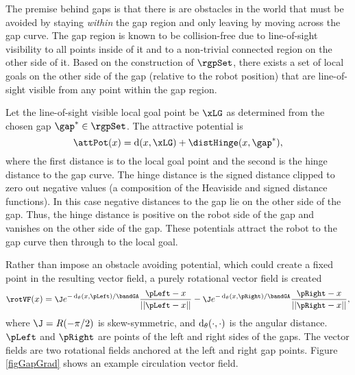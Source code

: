 The premise behind gaps is that there is are obstacles in the world that
must be avoided by staying {\em within} the gap region and only leaving
by moving across the gap curve.
The gap region is known to be collision-free due to line-of-sight
visibility to all points inside of it and to a non-trivial connected
region on the other side of it.  Based on the construction of $\rgpSet$,
there exists a set of local goals on the other side of the gap (relative
to the robot position) that are line-of-sight visible from any point
within the gap region.  

Let the line-of-sight visible local goal point be $\xLG$ as determined
from the chosen gap $\gap^* \in \rgpSet$.  The attractive potential is 
\begin{equation} \label{eq:dpot}
  \attPot(x) = \dist(x, \xLG) + \distHinge(x, \gap^*),
\end{equation}
where the first distance is to the local goal point and the second is
the hinge distance to the gap curve. The hinge distance is the signed
distance clipped to zero out negative values (a composition of the
Heaviside and signed distance functions). In this case negative
distances to the gap lie on the other side of the gap. Thus, the hinge
distance is positive on the robot side of the gap and  vanishes on the
other side of the gap.  These potentials attract the robot to the gap
curve then through to the local goal.  

Rather than impose an obstacle avoiding potential, which could
create a fixed point in the resulting vector field, a purely rotational
vector field is created 
\begin{equation} \label{eq:gcirc}
  \small \rotVF(x) = 
     \J e^{-\dist_\theta(x, \pLeft)/\bandGA}  
      \frac{\pLeft  - x}{||\pLeft  - x||} \\
     - \J e^{-\dist_\theta(x, \pRight)/\bandGA} 
       \frac{\pRight - x}{||\pRight - x||},
\end{equation}
where $\J = R(-\pi/2)$ is skew-symmetric, and $\operatorname{d}_\theta(\cdot,
\cdot)$ is the angular distance. $\pLeft$ and $\pRight$ are
points of the left and right sides of the gaps. The vector fields are two
rotational fields anchored at the left and right gap points.  Figure
\ref{figGapGrad} shows an example circulation vector field. 

